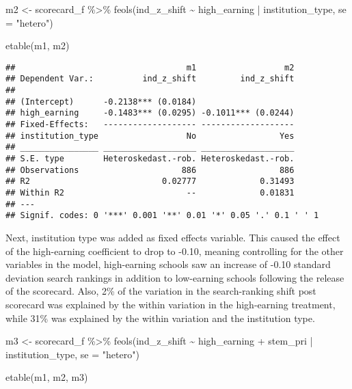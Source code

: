 \documentclass[
]{article}
\newenvironment{Shaded}{\begin{snugshade}}{\end{snugshade}}
\newcommand{\AttributeTok}[1]{\textcolor[rgb]{0.77,0.63,0.00}{#1}}
\newcommand{\FunctionTok}[1]{\textcolor[rgb]{0.00,0.00,0.00}{#1}}
\newcommand{\NormalTok}[1]{#1}
\newcommand{\OtherTok}[1]{\textcolor[rgb]{0.56,0.35,0.01}{#1}}
\newcommand{\SpecialCharTok}[1]{\textcolor[rgb]{0.00,0.00,0.00}{#1}}
\newcommand{\StringTok}[1]{\textcolor[rgb]{0.31,0.60,0.02}{#1}}
\begin{document}
\begin{Shaded}
\begin{Highlighting}[]
\NormalTok{m2 }\OtherTok{\textless{}{-}}\NormalTok{ scorecard\_f }\SpecialCharTok{\%\textgreater{}\%} \FunctionTok{feols}\NormalTok{(ind\_z\_shift }\SpecialCharTok{\textasciitilde{}}\NormalTok{ high\_earning }\SpecialCharTok{|}\NormalTok{ institution\_type, }\AttributeTok{se =} \StringTok{"hetero"}\NormalTok{)}

\FunctionTok{etable}\NormalTok{(m1, m2)}
\end{Highlighting}
\end{Shaded}

\begin{verbatim}
##                                   m1                  m2
## Dependent Var.:          ind_z_shift         ind_z_shift
##                                                         
## (Intercept)      -0.2138*** (0.0184)                    
## high_earning     -0.1483*** (0.0295) -0.1011*** (0.0244)
## Fixed-Effects:   ------------------- -------------------
## institution_type                  No                 Yes
## ________________ ___________________ ___________________
## S.E. type        Heteroskedast.-rob. Heteroskedast.-rob.
## Observations                     886                 886
## R2                           0.02777             0.31493
## Within R2                         --             0.01831
## ---
## Signif. codes: 0 '***' 0.001 '**' 0.01 '*' 0.05 '.' 0.1 ' ' 1
\end{verbatim}

Next, institution type was added as fixed effects variable. This caused
the effect of the high-earning coefficient to drop to -0.10, meaning
controlling for the other variables in the model, high-earning schools
saw an increase of -0.10 standard deviation search rankings in addition
to low-earning schools following the release of the scorecard. Also, 2\%
of the variation in the search-ranking shift post scorecard was
explained by the within variation in the high-earning treatment, while
31\% was explained by the within variation and the institution type.

\begin{Shaded}
\begin{Highlighting}[]
\NormalTok{m3 }\OtherTok{\textless{}{-}}\NormalTok{ scorecard\_f }\SpecialCharTok{\%\textgreater{}\%} \FunctionTok{feols}\NormalTok{(ind\_z\_shift }\SpecialCharTok{\textasciitilde{}}\NormalTok{ high\_earning }\SpecialCharTok{+}\NormalTok{ stem\_pri }\SpecialCharTok{|}\NormalTok{ institution\_type, }\AttributeTok{se =} \StringTok{"hetero"}\NormalTok{)}

\FunctionTok{etable}\NormalTok{(m1, m2, m3)}
\end{Highlighting}
\end{Shaded}
\end{document}
